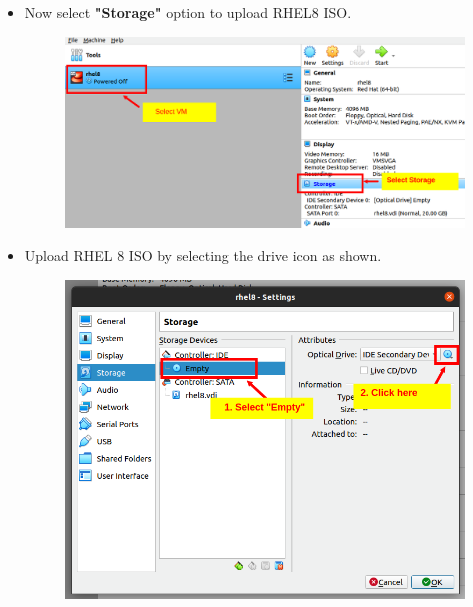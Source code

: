 \begin{flushleft}
\begin{itemize}
	\item Now select \textbf{"Storage"} option to upload RHEL8 ISO.
	\begin{figure}[h!]
		\centering
		\includegraphics[scale=.25]{content/chapter18/images/image8.png}
	\end{figure}		
	

	\item Upload RHEL 8 ISO by selecting the drive icon as shown.
	\begin{figure}[h!]
		\centering
		\includegraphics[scale=.3]{content/chapter18/images/image9.png}
	\end{figure}		
	

\end{itemize}
\end{flushleft}
